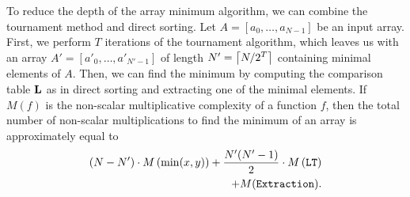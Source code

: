 	To reduce the depth of the array minimum algorithm, we can combine the tournament method and direct sorting.
	Let $A = [a_0,\dots,a_{N-1}]$ be an input array.
	First, we perform $T$ iterations of the tournament algorithm, which leaves us with an array $A' = [a'_0, \dots, a'_{N'-1}]$ of length $N' = \left\lceil N/2^T \right\rceil$ containing minimal elements of $A$.
	Then, we can find the minimum by computing the comparison table $\mathbf{L}$ as in direct sorting and extracting one of the minimal elements.
	If $M(f)$ is the non-scalar multiplicative complexity of a function $f$, then the total number of non-scalar multiplications to find the minimum of an array is approximately equal to
	\begin{align*}
		(N - N') \cdot M\left(\min(x,y)\right) + \frac{N'(N'-1)}{2} \cdot M\left(\mathtt{LT}\right) \\
		+ M(\mathtt{Extraction}).
	\end{align*}
	

